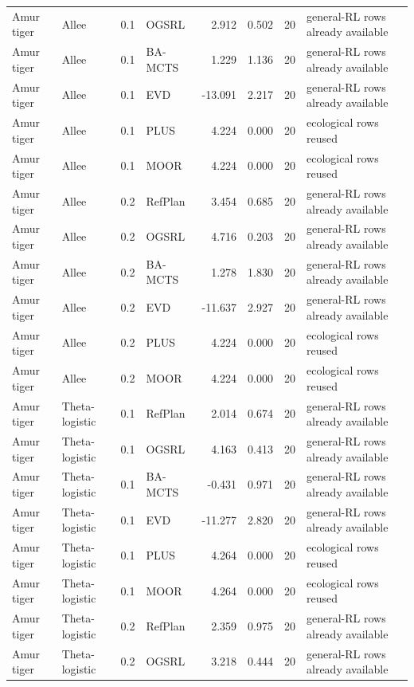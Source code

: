 \documentclass[10pt]{article}
\begin{document}
\begin{landscape}
\begin{center}
\begin{longtable}{@{}llclr rrp{5.2cm}@{}}
Amur tiger & Allee & 0.1 & OGSRL & 2.912 & 0.502 & 20 & general-RL rows already available \\
Amur tiger & Allee & 0.1 & BA-MCTS & 1.229 & 1.136 & 20 & general-RL rows already available \\
Amur tiger & Allee & 0.1 & EVD & -13.091 & 2.217 & 20 & general-RL rows already available \\
Amur tiger & Allee & 0.1 & PLUS & 4.224 & 0.000 & 20 & ecological rows reused \\
Amur tiger & Allee & 0.1 & MOOR & 4.224 & 0.000 & 20 & ecological rows reused \\
\addlinespace[1.5pt]
Amur tiger & Allee & 0.2 & RefPlan & 3.454 & 0.685 & 20 & general-RL rows already available \\
Amur tiger & Allee & 0.2 & OGSRL & 4.716 & 0.203 & 20 & general-RL rows already available \\
Amur tiger & Allee & 0.2 & BA-MCTS & 1.278 & 1.830 & 20 & general-RL rows already available \\
Amur tiger & Allee & 0.2 & EVD & -11.637 & 2.927 & 20 & general-RL rows already available \\
Amur tiger & Allee & 0.2 & PLUS & 4.224 & 0.000 & 20 & ecological rows reused \\
Amur tiger & Allee & 0.2 & MOOR & 4.224 & 0.000 & 20 & ecological rows reused \\
\addlinespace[1.5pt]
Amur tiger & Theta-logistic & 0.1 & RefPlan & 2.014 & 0.674 & 20 & general-RL rows already available \\
Amur tiger & Theta-logistic & 0.1 & OGSRL & 4.163 & 0.413 & 20 & general-RL rows already available \\
Amur tiger & Theta-logistic & 0.1 & BA-MCTS & -0.431 & 0.971 & 20 & general-RL rows already available \\
Amur tiger & Theta-logistic & 0.1 & EVD & -11.277 & 2.820 & 20 & general-RL rows already available \\
Amur tiger & Theta-logistic & 0.1 & PLUS & 4.264 & 0.000 & 20 & ecological rows reused \\
Amur tiger & Theta-logistic & 0.1 & MOOR & 4.264 & 0.000 & 20 & ecological rows reused \\
\addlinespace[1.5pt]
Amur tiger & Theta-logistic & 0.2 & RefPlan & 2.359 & 0.975 & 20 & general-RL rows already available \\
Amur tiger & Theta-logistic & 0.2 & OGSRL & 3.218 & 0.444 & 20 & general-RL rows already available \\

\end{longtable}
\end{center}
\end{landscape}
\end{document}
